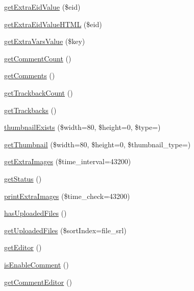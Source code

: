 \begin{DoxyCompactItemize}
\item 
\hyperlink{classdocumentItem_a9c2574375684cd06a16532744e279c65}{get\+Extra\+Eid\+Value} (\$eid)
\item 
\hyperlink{classdocumentItem_a52091af79c2df80f8f3c75e37adc2000}{get\+Extra\+Eid\+Value\+H\+T\+ML} (\$eid)
\item 
\hyperlink{classdocumentItem_ab555cb21a9a50d683836b8d4604d47f5}{get\+Extra\+Vars\+Value} (\$key)
\item 
\hyperlink{classdocumentItem_a9ed429fc56e6f95ef097645c772aa4e5}{get\+Comment\+Count} ()
\item 
\hyperlink{classdocumentItem_ad85b3da641f8bd477963d7290383e6be}{get\+Comments} ()
\item 
\hyperlink{classdocumentItem_af1520e91e8dd49202cfb93909db61c48}{get\+Trackback\+Count} ()
\item 
\hyperlink{classdocumentItem_a0c69601e59c290048081bf8d8aa7602e}{get\+Trackbacks} ()
\item 
\hyperlink{classdocumentItem_afb61d7a6035bceb7a48e3db699c6127b}{thumbnail\+Exists} (\$width=80, \$height=0, \$type=\textquotesingle{}\textquotesingle{})
\item 
\hyperlink{classdocumentItem_ac45108459a38d6780d8575e892e0b85b}{get\+Thumbnail} (\$width=80, \$height=0, \$thumbnail\+\_\+type=\textquotesingle{}\textquotesingle{})
\item 
\hyperlink{classdocumentItem_a0f72df4345359453aa01ff1490071c5a}{get\+Extra\+Images} (\$time\+\_\+interval=43200)
\item 
\hyperlink{classdocumentItem_aa750ee0716698bf29c9690382b7fa3ef}{get\+Status} ()
\item 
\hyperlink{classdocumentItem_a9d185a16e4439823e7e4871c2fb0659a}{print\+Extra\+Images} (\$time\+\_\+check=43200)
\item 
\hyperlink{classdocumentItem_af031d09271c9099d26b6619f9c436f68}{has\+Uploaded\+Files} ()
\item 
\hyperlink{classdocumentItem_a4ffff0d0a86cc44c6be0f46f644cdc42}{get\+Uploaded\+Files} (\$sort\+Index=\textquotesingle{}file\+\_\+srl\textquotesingle{})
\item 
\hyperlink{classdocumentItem_a26477197e85301bc88e35157fdcb7482}{get\+Editor} ()
\item 
\hyperlink{classdocumentItem_aff71a0f39ddc720c21c5cf39805b31a8}{is\+Enable\+Comment} ()
\item 
\hyperlink{classdocumentItem_a59ef94b52cf1a250aa4f29990e8d376d}{get\+Comment\+Editor} ()
\item 

\end{DoxyCompactItemize}
